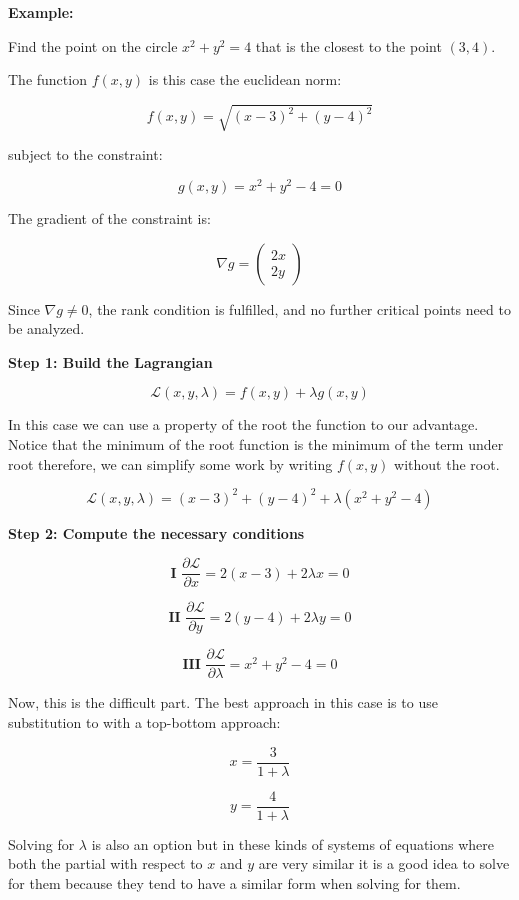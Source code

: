 \textbf{Example:}
\vspace{\baselineskip}

Find the point on the circle \(x^2 + y^2 = 4\) that is the closest to the point \((3,4)\).
\vspace{\baselineskip}

The function \(f(x,y)\) is this case the euclidean norm:

\[
    f(x, y) = \sqrt{(x - 3)^2 + (y - 4)^2}
\]

subject to the constraint:

\[
    g(x, y) = x^2 + y^2 - 4 = 0
\]

The gradient of the constraint is:

\[
    \nabla g = \begin{pmatrix} 2x \\ 2y \end{pmatrix}
\]

Since \( \nabla g \ne 0 \), the rank condition is fulfilled, and no further critical points 
need to be analyzed.
\vspace{\baselineskip}

\textbf{Step 1: Build the Lagrangian}

\[
    \mathcal{L}(x, y, \lambda) = f(x, y) + \lambda g(x, y)
\]

In this case we can use a property of the root the function to our advantage. Notice that the minimum 
of the root function is the minimum of the term under root therefore, we can simplify some work by writing 
\(f(x,y)\) without the root. 

\[
    \mathcal{L}(x, y, \lambda) = (x - 3)^2 + (y - 4)^2 + \lambda (x^2 + y^2 - 4)
\]

\textbf{Step 2: Compute the necessary conditions}

\[
    \textbf{I } \frac{\partial \mathcal{L}}{\partial x} = 2(x - 3) + 2\lambda x = 0
\]

\[
    \textbf{II } \frac{\partial \mathcal{L}}{\partial y} = 2(y - 4) + 2\lambda y = 0
\]

\[
    \textbf{III } \frac{\partial \mathcal{L}}{\partial \lambda} = x^2 + y^2 - 4 = 0
\]

Now, this is the difficult part. The best approach in this case is to use substitution to 
with a top-bottom approach:

\[
    x = \frac{3}{1 + \lambda}
\]

\[
    y = \frac{4}{1 + \lambda}
\]

Solving for \(\lambda\) is also an option but in these kinds of systems of equations where 
both the partial with respect to \(x\) and \(y\) are very similar it is a good idea to solve for them 
because they tend to have a similar form when solving for them.

